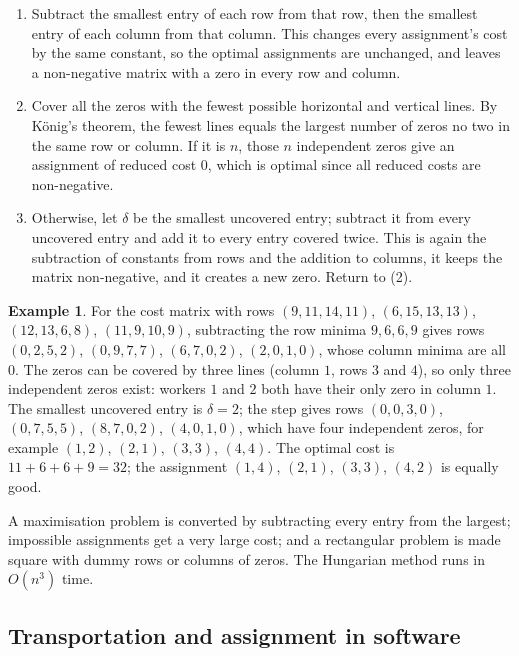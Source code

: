 \documentclass[11pt,a4paper]{article}
\numberwithin{equation}{section}
\theoremstyle{definition}
\newtheorem{exa}[thm]{Example}
\begin{document}
\begin{enumerate}[label=(\arabic*)]
\item Subtract the smallest entry of each row from that row, then the smallest entry of each column from that column. This changes every assignment's cost by the same constant, so the optimal assignments are unchanged, and leaves a non-negative matrix with a zero in every row and column.
\item Cover all the zeros with the fewest possible horizontal and vertical lines. By K\"onig's theorem, the fewest lines equals the largest number of zeros no two in the same row or column. If it is $n$, those $n$ independent zeros give an assignment of reduced cost $0$, which is optimal since all reduced costs are non-negative.
\item Otherwise, let $\delta$ be the smallest uncovered entry; subtract it from every uncovered entry and add it to every entry covered twice. This is again the subtraction of constants from rows and the addition to columns, it keeps the matrix non-negative, and it creates a new zero. Return to (2).
\end{enumerate}

\begin{exa}
\label{ex:hungarian}
For the cost matrix with rows $(9, 11, 14, 11)$, $(6, 15, 13, 13)$, $(12, 13, 6, 8)$, $(11, 9, 10, 9)$, subtracting the row minima $9, 6, 6, 9$ gives rows $(0, 2, 5, 2)$, $(0, 9, 7, 7)$, $(6, 7, 0, 2)$, $(2, 0, 1, 0)$, whose column minima are all $0$. The zeros can be covered by three lines (column $1$, rows $3$
and $4$), so only three independent zeros exist: workers $1$ and $2$ both have their only zero in column $1$. The smallest uncovered entry is $\delta = 2$; the step gives rows $(0, 0, 3, 0)$, $(0, 7, 5, 5)$, $(8, 7, 0, 2)$, $(4, 0, 1, 0)$, which have four independent zeros, for example $(1, 2)$, $(2, 1)$, $(3, 3)$,
$(4, 4)$. The optimal cost is $11 + 6 + 6 + 9 = 32$; the assignment $(1, 4)$, $(2, 1)$, $(3, 3)$, $(4, 2)$ is equally good.
\end{exa}

A maximisation problem is converted by subtracting every entry from the largest; impossible assignments get a very large cost; and a rectangular problem is made square with dummy rows or columns of zeros. The Hungarian method runs in $O(n^3)$ time.

\subsection{Transportation and assignment in software}
\label{ssec:software7}
\end{document}
